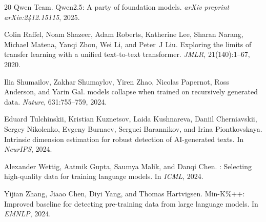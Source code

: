 \documentclass[11pt,a4paper]{article}
\begin{document}
\begin{thebibliography}{20}
Qwen Team.
\newblock Qwen2.5: A party of foundation models.
\newblock \emph{arXiv preprint arXiv:2412.15115}, 2025.

Colin Raffel, Noam Shazeer, Adam Roberts, Katherine Lee, Sharan Narang, Michael Matena, Yanqi Zhou, Wei Li, and Peter~J Liu.
\newblock Exploring the limits of transfer learning with a unified text-to-text transformer.
\newblock \emph{JMLR}, 21(140):1--67, 2020.

Ilia Shumailov, Zakhar Shumaylov, Yiren Zhao, Nicolas Papernot, Ross Anderson, and Yarin Gal.
 models collapse when trained on recursively generated data.
\newblock \emph{Nature}, 631:755--759, 2024.

Eduard Tulchinskii, Kristian Kuznetsov, Laida Kushnareva, Daniil Cherniavskii, Sergey Nikolenko, Evgeny Burnaev, Serguei Barannikov, and Irina Piontkovskaya.
\newblock Intrinsic dimension estimation for robust detection of {AI}-generated texts.
\newblock In \emph{NeurIPS}, 2024.

Alexander Wettig, Aatmik Gupta, Saumya Malik, and Danqi Chen.
: Selecting high-quality data for training language models.
\newblock In \emph{ICML}, 2024.

Yijian Zhang, Jiaao Chen, Diyi Yang, and Thomas Hartvigsen.
\newblock Min-{K}\%++: Improved baseline for detecting pre-training data from large language models.
\newblock In \emph{EMNLP}, 2024.

\end{thebibliography}
\end{document}
